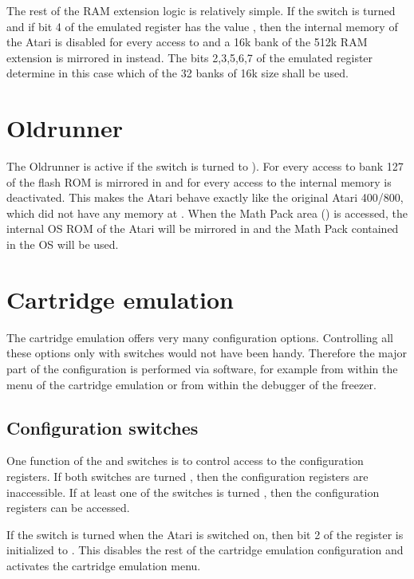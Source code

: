 The rest of the RAM extension logic is relatively simple. If the 
switch is turned  and if bit 4 of the emulated  register
has the value , then the internal memory of the Atari is disabled for
every access to  and a 16k bank of the 512k RAM extension is
mirrored in instead. The bits 2,3,5,6,7 of the emulated  register
determine in this case which of the 32 banks of 16k size shall be used.


\section{Oldrunner}
The Oldrunner is active if the  switch is turned to ).
For every access to  bank 127 of the flash ROM is mirrored in and for every
access to  the internal memory is deactivated. This makes the
Atari behave exactly like the original Atari 400/800, which did not have any
memory at  . When the Math Pack area () is
accessed, the internal OS ROM of the Atari will be mirrored in and the Math Pack
contained in the OS will be used.

\section{Cartridge emulation}

The cartridge emulation offers very many configuration options. Controlling all
these options only with switches would not have been handy. Therefore the major
part of the configuration is performed via software, for example from within the
menu of the cartridge emulation or from within the debugger of the freezer.

\subsection{Configuration switches}

One function of the  and  switches is to control
access to the configuration registers. If both switches are turned ,
then the configuration registers are inaccessible. If at least one of the
switches is turned , then the configuration registers
 can be accessed.

If the  switch is turned  when the Atari is switched on,
then bit 2 of the register  is initialized to . This disables the
rest of the cartridge emulation configuration and activates the cartridge
emulation menu.

